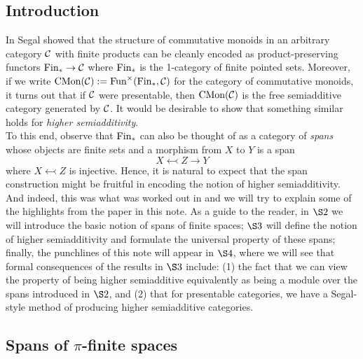 \def\colim{\qopname\relax m{colim}}
\def\rlim{\qopname\relax m{R^1lim}}
\def\holim{\qopname\relax m{holim}}
\def\hocolim{\qopname\relax m{hocolim}}




\subsection{Introduction}
In \cite{segalCatCohom} Segal showed that the structure of commutative monoids in an arbitrary category $\mathcal{C}$ with finite products can be cleanly encoded as product-preserving functors $\text{Fin}_*\rightarrow \mathcal{C}$ where $\text{Fin}_*$ is the 1-category of finite pointed sets. Moreover, if we write $\text{CMon}(\mathcal{C}) := \text{Fun}^{\times}(\text{Fin}_*, \mathcal{C})$ for the category of commutative monoids, it turns out that if $\mathcal{C}$ were presentable, then $\text{CMon}(\mathcal{C})$ is the free semiadditive category generated by $\mathcal{C}$. It would be desirable to show that something similar holds for \textit{higher semiadditivity}.\\


To this end, observe that $\text{Fin}_*$ can also be thought of as a category of \textit{spans} whose objects are finite sets and a morphism from $X$ to $Y$ is a span
\[X \leftarrowtail Z \rightarrow Y\] where $X\leftarrowtail Z$ is injective. Hence, it is natural to expect that the span construction might be fruitful in encoding the notion of higher semiadditivity. And indeed, this was what was worked out in \cite{harpazAmbidex} and we will try to explain some of the highlights from the paper in this note. As a guide to the reader, in \hyperref[sec:Spans]{$\S2$} we will introduce the basic notion of spans of finite spaces; \hyperref[sec:Semiadditivity]{$\S3$} will define the notion of higher semiadditivity and formulate the universal property of these spans; finally, the punchlines of this note will appear in \hyperref[sec:FormalConsequences]{$\S4$}, where we will see that formal consequences of the results in \hyperref[sec:Semiadditivity]{$\S3$} include: (1) the fact that we can view the property of being higher semiadditive equivalently as being a module over the spans introduced in \hyperref[sec:Spans]{$\S2$}, and (2) that for presentable categories, we have a Segal-style method of producing higher semiadditive categories.



\subsection{Spans of $\pi$-finite spaces}\label{sec:Spans}
